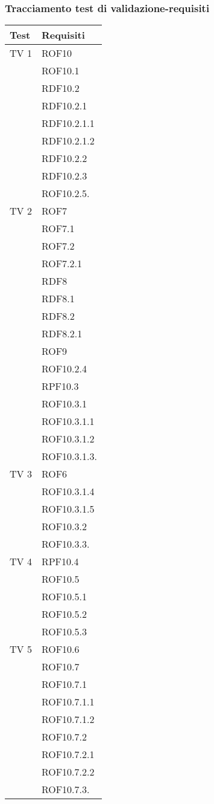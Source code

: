 \subsubsection{Tracciamento test di validazione-requisiti}
\begin{center}
\begin{longtable}{|p{7cm}|p{7cm}|}
\toprule
\textbf{Test} & \textbf{Requisiti}\\
\midrule
TV 1 & ROF10\\ & ROF10.1\\ & RDF10.2\\ & RDF10.2.1\\ &  RDF10.2.1.1\\ &  RDF10.2.1.2\\ &  RDF10.2.2 \\ & RDF10.2.3\\ &   ROF10.2.5.\\
\midrule
TV 2 & ROF7\\ &  ROF7.1\\ &  ROF7.2\\ &  ROF7.2.1\\ &  RDF8\\ &  RDF8.1\\ &  RDF8.2\\ &  RDF8.2.1\\ &  ROF9\\ &  ROF10.2.4\\ &  RPF10.3\\ &  ROF10.3.1\\ &  ROF10.3.1.1\\ &  ROF10.3.1.2\\ &  ROF10.3.1.3.\\
\midrule
TV 3 & ROF6\\ &  ROF10.3.1.4\\ &  ROF10.3.1.5\\ &  ROF10.3.2\\ &  ROF10.3.3.\\
\midrule
TV 4 &  RPF10.4\\ &  ROF10.5\\ &  ROF10.5.1\\ &  ROF10.5.2\\ &  ROF10.5.3\\
\midrule
TV 5 &  ROF10.6\\ &  ROF10.7\\ &  ROF10.7.1\\ &  ROF10.7.1.1\\ &  ROF10.7.1.2\\ &  ROF10.7.2\\ &  ROF10.7.2.1\\ &  ROF10.7.2.2\\ &  ROF10.7.3.\\

\end{longtable}
\end{center}
